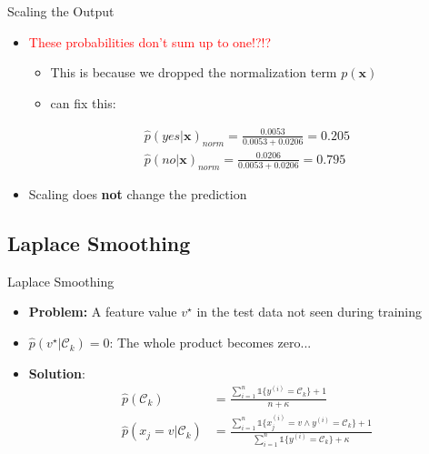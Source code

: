 \begin{frame}{Scaling the Output}{}
	\begin{itemize}
		\item {} \textcolor{red}{These probabilities don't sum up to one!?!?}
		\begin{itemize}
			\item This is because we dropped the normalization term $p(\bm{x})$
			\item {} can fix this:
		\end{itemize}
		\begin{align*}
			\widehat{p}(yes \vert \bm{x})_{norm} = \frac{0.0053}{0.0053 + 0.0206} = \bm{0.205} 	\\[3mm]
			\widehat{p}(no \vert \bm{x})_{norm} = \frac{0.0206}{0.0053 + 0.0206} = \bm{0.795}
		\end{align*}
		\item Scaling does \textbf{not} change the prediction
	\end{itemize}
\end{frame}


\subsection{Laplace Smoothing}

\begin{frame}{Laplace Smoothing}{}
	\begin{itemize}
		\item \textbf{Problem:} A feature value $v^{\star}$ in the test data not seen during training
		\item $\widehat{p}(v^{\star} \vert \mathcal{C}_k) = 0$: The whole product becomes zero...
		\item \textbf{Solution}: 
		\begin{align}
			\widehat{p}(\mathcal{C}_k)
				&= \frac{\sum_{i=1}^n \mathbb{1}\{ y^{(i)} = \mathcal{C}_k \} + 1} {n + \kappa} \\[3mm]
			\widehat{p}(x_j = v \vert \mathcal{C}_k)
				&= \frac{\sum_{i=1}^n \mathbb{1}\{ x_j^{(i)} = v \wedge y^{(i)} = \mathcal{C}_k \} + 1}
					{\sum_{i=1}^n \mathbb{1}\{ y^{(i)} = \mathcal{C}_k \} + \kappa}
		\end{align}
	\end{itemize}
\end{frame}


